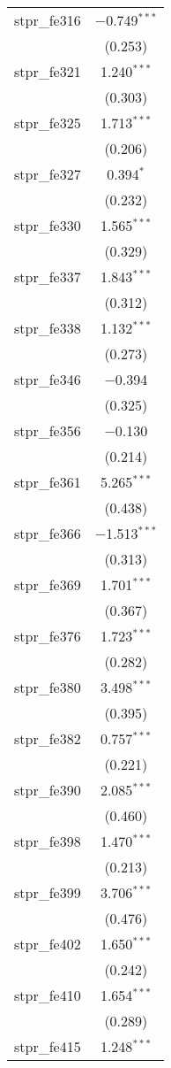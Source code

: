 \begin{table}[!htbp]
\begin{tabular}{@{\extracolsep{5pt}}lc}
  stpr\_fe316 & $-$0.749$^{***}$ \\ 
  & (0.253) \\ 
  stpr\_fe321 & 1.240$^{***}$ \\ 
  & (0.303) \\ 
  stpr\_fe325 & 1.713$^{***}$ \\ 
  & (0.206) \\ 
  stpr\_fe327 & 0.394$^{*}$ \\ 
  & (0.232) \\ 
  stpr\_fe330 & 1.565$^{***}$ \\ 
  & (0.329) \\ 
  stpr\_fe337 & 1.843$^{***}$ \\ 
  & (0.312) \\ 
  stpr\_fe338 & 1.132$^{***}$ \\ 
  & (0.273) \\ 
  stpr\_fe346 & $-$0.394 \\ 
  & (0.325) \\ 
  stpr\_fe356 & $-$0.130 \\ 
  & (0.214) \\ 
  stpr\_fe361 & 5.265$^{***}$ \\ 
  & (0.438) \\ 
  stpr\_fe366 & $-$1.513$^{***}$ \\ 
  & (0.313) \\ 
  stpr\_fe369 & 1.701$^{***}$ \\ 
  & (0.367) \\ 
  stpr\_fe376 & 1.723$^{***}$ \\ 
  & (0.282) \\ 
  stpr\_fe380 & 3.498$^{***}$ \\ 
  & (0.395) \\ 
  stpr\_fe382 & 0.757$^{***}$ \\ 
  & (0.221) \\ 
  stpr\_fe390 & 2.085$^{***}$ \\ 
  & (0.460) \\ 
  stpr\_fe398 & 1.470$^{***}$ \\ 
  & (0.213) \\ 
  stpr\_fe399 & 3.706$^{***}$ \\ 
  & (0.476) \\ 
  stpr\_fe402 & 1.650$^{***}$ \\ 
  & (0.242) \\ 
  stpr\_fe410 & 1.654$^{***}$ \\ 
  & (0.289) \\ 
  stpr\_fe415 & 1.248$^{***}$ \\ 

\end{tabular}
\end{table}
